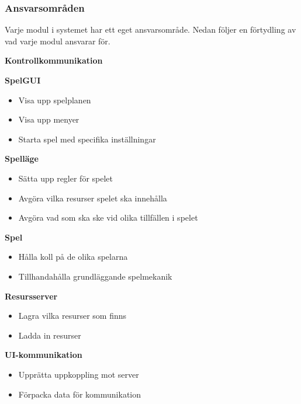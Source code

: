 \subsubsection*{Ansvarsområden}
Varje modul i systemet har ett eget ansvarsområde. Nedan följer en förtydling av vad varje modul ansvarar för.

\begin{labeling}{\small{\textbf{Kontrollkommunikation}}}
    \item [\small{\textbf{SpelGUI}}]
        \begin{itemize}
            \item Visa upp spelplanen
            \item Visa upp menyer
            \item Starta spel med specifika inställningar
            \newline
        \end{itemize}

    \item [\small{\textbf{Spelläge}}]
        \begin{itemize}
            \item Sätta upp regler för spelet
            \item Avgöra vilka resurser spelet ska innehålla
            \item Avgöra vad som ska ske vid olika tillfällen i spelet
            \newline
        \end{itemize}

    \item [\small{\textbf{Spel}}]
        \begin{itemize}
            \item Hålla koll på de olika spelarna
            \item Tillhandahålla grundläggande spelmekanik
            \newline
        \end{itemize}

    \item [\small{\textbf{Resursserver}}]
        \begin{itemize}
            \item Lagra vilka resurser som finns
            \item Ladda in resurser
            \newline
        \end{itemize}

    \item [\small{\textbf{UI-kommunikation}}]
        \begin{itemize}
            \item Upprätta uppkoppling mot server
            \item Förpacka data för kommunikation
            \newline
        \end{itemize}


\end{labeling}

